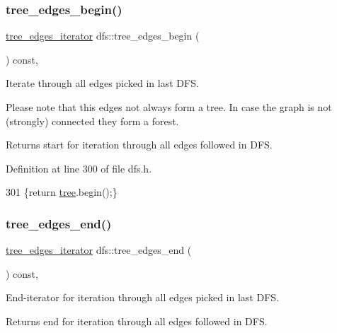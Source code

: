\subsubsection{\texorpdfstring{tree\+\_\+edges\+\_\+begin()}{tree\_edges\_begin()}}
{\footnotesize\ttfamily \mbox{\hyperlink{classdfs_accde8d5403404f6d22fe4756d4ffedd5}{tree\+\_\+edges\+\_\+iterator}} dfs\+::tree\+\_\+edges\+\_\+begin (\begin{DoxyParamCaption}{ }\end{DoxyParamCaption}) const\hspace{0.3cm}{\ttfamily [inline]}, {\ttfamily [inherited]}}



Iterate through all edges picked in last D\+FS. 

Please note that this edges not always form a tree. In case the graph is not (strongly) connected they form a forest.

\begin{DoxyReturn}{Returns}
start for iteration through all edges followed in D\+FS. 
\end{DoxyReturn}


Definition at line 300 of file dfs.\+h.


\begin{DoxyCode}
301     \{\textcolor{keywordflow}{return} \mbox{\hyperlink{classdfs_aed496b618a937723bfec0b463e17e8d5}{tree}}.begin();\}
\end{DoxyCode}
\mbox{\label{classdfs_ad1b9f759569cb52ba7ee415862c79831}} 
\subsubsection{\texorpdfstring{tree\+\_\+edges\+\_\+end()}{tree\_edges\_end()}}
{\footnotesize\ttfamily \mbox{\hyperlink{classdfs_accde8d5403404f6d22fe4756d4ffedd5}{tree\+\_\+edges\+\_\+iterator}} dfs\+::tree\+\_\+edges\+\_\+end (\begin{DoxyParamCaption}{ }\end{DoxyParamCaption}) const\hspace{0.3cm}{\ttfamily [inline]}, {\ttfamily [inherited]}}



End-\/iterator for iteration through all edges picked in last D\+FS. 

\begin{DoxyReturn}{Returns}
end for iteration through all edges followed in D\+FS. 
\end{DoxyReturn}


